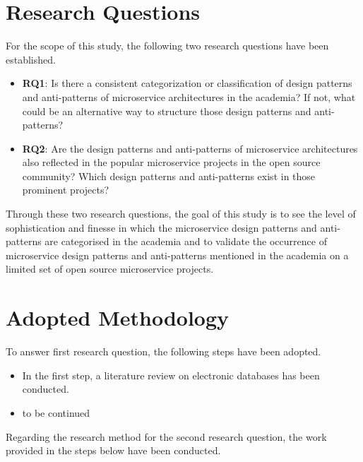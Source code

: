 \documentclass{Configuration_Files/PoliMi3i_thesis}
\begin{document}
\section{Research Questions}
\label{sec:research_questions}

For the scope of this study, the following two research questions have been established.

\begin{itemize}
    \item \textbf{RQ1}: Is there a consistent categorization or classification of design patterns and anti-patterns of microservice architectures in the academia?
    If not, what could be an alternative way to structure those design patterns and anti-patterns?
    
    \item \textbf{RQ2}: Are the design patterns and anti-patterns of microservice architectures also reflected in the popular microservice projects in the open source community?
    Which design patterns and anti-patterns exist in those prominent projects?
\end{itemize}

Through these two research questions, the goal of this study is to see the level of sophistication and finesse in which the microservice design patterns and anti-patterns are categorised in the academia and to validate the occurrence of microservice design patterns and anti-patterns mentioned in the academia on a limited set of open source microservice projects.

\section{Adopted Methodology}
\label{sec:adopted_method}

To answer first research question, the following steps have been adopted.

\begin{itemize}
    \item In the first step, a literature review on electronic databases has been conducted.

    \item to be continued
\end{itemize}

Regarding the research method for the second research question, the work provided in the steps below have been conducted.
\end{document}
